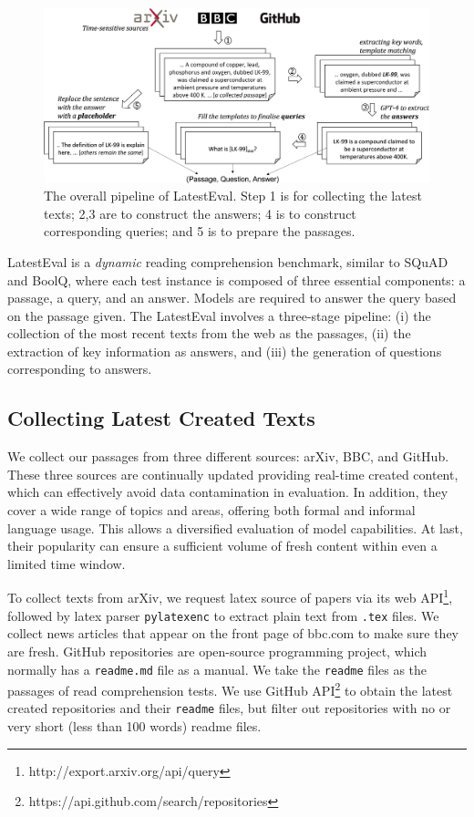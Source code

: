 \documentclass[letterpaper]{article} %
\begin{document}
\begin{figure}
    \centering
    \includegraphics[width=\textwidth]{latesteval2.png}
    \caption{The overall pipeline of LatestEval. Step \textsc{1} is for collecting the latest texts; \textsc{2,3} are to construct the answers; \textsc{4} is to construct corresponding queries; and \textsc{5} is to prepare the passages.}
    \label{fig:pipeline}
\end{figure}

LatestEval is a \textit{dynamic} reading comprehension benchmark, similar to SQuAD \cite{rajpurkar2018know} and BoolQ, where each test instance is composed of three essential components: a passage, a query, and an answer. Models are required to answer the query based on the passage given. The LatestEval involves a three-stage pipeline: (i) the collection of the most recent texts from the web as the passages, (ii) the extraction of key information as answers, and (iii) the generation of questions corresponding to answers.

\subsection{Collecting Latest Created Texts}

We collect our passages from three different sources: arXiv, BBC, and GitHub. These three sources are continually updated providing real-time created content, which can effectively avoid data contamination in evaluation. In addition, they cover a wide range of topics and areas, offering both formal and informal language usage. This allows a diversified evaluation of model capabilities. At last, their popularity can ensure a sufficient volume of fresh content within even a limited time window.

To collect texts from arXiv, we request latex source of papers via its web API\footnote{http://export.arxiv.org/api/query}, followed by latex parser \texttt{pylatexenc} to extract plain text from \texttt{.tex} files. We collect news articles that appear on the front page of bbc.com to make sure they are fresh. GitHub repositories are open-source programming project, which normally has a \texttt{readme.md} file as a manual. We take the \texttt{readme} files as the passages of read comprehension tests. We use GitHub API\footnote{https://api.github.com/search/repositories} to obtain the latest created repositories and their \texttt{readme} files, but filter out repositories with no or very short (less than 100 words) readme files.
\end{document}
